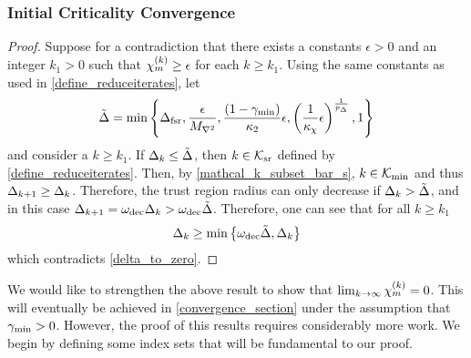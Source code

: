 \subsubsection{Initial Criticality Convergence}


 

\begin{proof}
Suppose for a contradiction that there exists a constants $\epsilon > 0$ and an integer $k_1 > 0$ such that ${\chi_m^{(k)}} \ge \epsilon$ for each $k \ge k_1$.
Using the same constants as used in \cref{define_reduceiterates}, let
\begin{align*}
\tilde \Delta = \min \left\{
\Delta_{\textrm{fsr}}, 
\frac{\epsilon}{{M_{\nabla^2}}}, 
\frac{(1 - \gamma_{\textrm{min}})}{{\kappa_2}} \epsilon,
\left(\frac 1 {\kappa_{\chi}} \epsilon \right)^{\frac 1 {p_{\Delta}}},
1\right\}
\end{align*}
and consider a $k \ge k_1$.
If $\Delta_k \le \tilde \Delta$, then $k \in {\mathcal K_{\textrm{sr}}}$ defined by \cref{define_reduceiterates}.
Then, by \cref{mathcal_k_subset_bar_s},  $k \in {\mathcal K_{\textrm{min}}}$ and thus $\Delta_{k+1} \ge \Delta_k$.
Therefore, the trust region radius can only decrease if $\Delta_k > \tilde \Delta$, and in this case $\Delta_{k+1} = \omega_{\text{dec}}\Delta_k > \omega_{\text{dec}} \tilde \Delta$.
Therefore, one can see that for all $k \ge k_1$
\begin{align}
\Delta_k \ge \min\left\{\omega_{\text{dec}} \tilde \Delta, \Delta_k \right\}
\end{align}
which contradicts \cref{delta_to_zero}.
\end{proof}

We would like to strengthen the above result to show that  $\lim_{k\to\infty} {\chi_m^{(k)}} = 0$.   This will eventually be achieved in \cref{convergence_section} under the assumption that $\gamma_{\textrm{min}} >0$.   However, the proof of this results requires considerably more work.     We begin by defining some index sets that will be fundamental to our proof.


